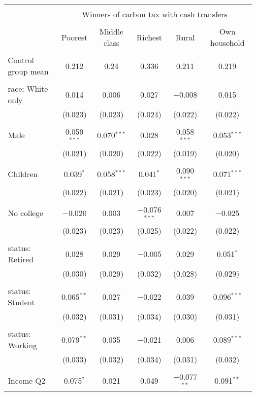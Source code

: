 
\begin{tabular}{@{\extracolsep{5pt}}lccccc} 
\\[-1.8ex]\hline 
\hline \\[-1.8ex] 
 & \multicolumn{5}{c}{Winners of carbon tax with cash transfers} \\ 
\cline{2-6} 
\\[-1.8ex] & Poorest & Middle class & Richest & Rural & Own household \\ 
\hline \\[-1.8ex] 
 Control group mean & 0.212 & 0.24 & 0.336 & 0.211 & 0.219  \\ \hline \\[-1.8ex] race: White only & 0.014 & 0.006 & 0.027 & $-$0.008 & 0.015 \\ 
  & (0.023) & (0.023) & (0.024) & (0.022) & (0.022) \\ 
  & & & & & \\ 
 Male & 0.059$^{***}$ & 0.070$^{***}$ & 0.028 & 0.058$^{***}$ & 0.053$^{***}$ \\ 
  & (0.021) & (0.020) & (0.022) & (0.019) & (0.020) \\ 
  & & & & & \\ 
 Children & 0.039$^{*}$ & 0.058$^{***}$ & 0.041$^{*}$ & 0.090$^{***}$ & 0.071$^{***}$ \\ 
  & (0.022) & (0.021) & (0.023) & (0.020) & (0.021) \\ 
  & & & & & \\ 
 No college & $-$0.020 & 0.003 & $-$0.076$^{***}$ & 0.007 & $-$0.025 \\ 
  & (0.023) & (0.023) & (0.025) & (0.022) & (0.022) \\ 
  & & & & & \\ 
 status: Retired & 0.028 & 0.029 & $-$0.005 & 0.029 & 0.051$^{*}$ \\ 
  & (0.030) & (0.029) & (0.032) & (0.028) & (0.029) \\ 
  & & & & & \\ 
 status: Student & 0.065$^{**}$ & 0.027 & $-$0.022 & 0.039 & 0.096$^{***}$ \\ 
  & (0.032) & (0.031) & (0.034) & (0.030) & (0.031) \\ 
  & & & & & \\ 
 status: Working & 0.079$^{**}$ & 0.035 & $-$0.021 & 0.006 & 0.089$^{***}$ \\ 
  & (0.033) & (0.032) & (0.034) & (0.031) & (0.032) \\ 
  & & & & & \\ 
 Income Q2 & 0.075$^{*}$ & 0.021 & 0.049 & $-$0.077$^{**}$ & 0.091$^{**}$ \\ 

\end{tabular}
